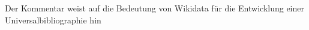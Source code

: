 Der Kommentar weist auf die Bedeutung von Wikidata für die Entwicklung
einer Universalbibliographie hin
